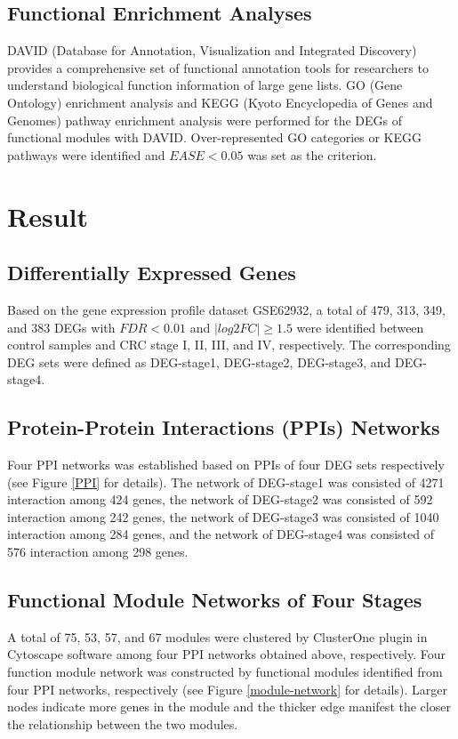 \documentclass[utf8]{frontiersSCNS} %
\begin{document}
\subsection{Functional Enrichment Analyses}
DAVID (Database for Annotation, Visualization and Integrated Discovery) \citep{sherman2009systematic} provides a comprehensive set of functional annotation tools for researchers to understand biological function information of large gene lists. GO (Gene Ontology) enrichment analysis and KEGG (Kyoto Encyclopedia of Genes and Genomes) pathway enrichment analysis were performed for the DEGs of functional modules with DAVID. Over-represented GO categories or KEGG pathways were identified and $EASE < 0.05$ was set as the criterion.

\section{Result}
\subsection{Differentially Expressed Genes}

Based on the gene expression profile dataset GSE62932, 
a total of 479, 313, 349, and 383 DEGs with $FDR < 0.01$ and $|log2FC|\geqslant 1.5$ were identified between control samples and CRC stage I, II, III, and IV, respectively.
The corresponding DEG sets were defined as DEG-stage1, DEG-stage2, DEG-stage3, and DEG-stage4.


\subsection{Protein-Protein Interactions (PPIs) Networks}
Four PPI networks was established based on PPIs of four DEG sets respectively (see Figure \ref{PPI} for details). 
The network of DEG-stage1 was consisted of 4271 interaction among 424 genes, 
the network of DEG-stage2 was consisted of 592 interaction among 242 genes, 
the network of DEG-stage3 was consisted of 1040 interaction among 284 genes, 
and the network of DEG-stage4 was consisted of 576 interaction among 298 genes.



\subsection{Functional Module Networks of Four Stages}
A total of 75, 53, 57, and 67 modules were clustered by ClusterOne plugin in Cytoscape software
among four PPI networks obtained above, respectively.
Four function module network was constructed by functional modules identified from four PPI networks, respectively (see Figure \ref{module-network} for details). Larger nodes indicate more genes in the module and the thicker edge manifest the closer the relationship between the two modules.
\end{document}
